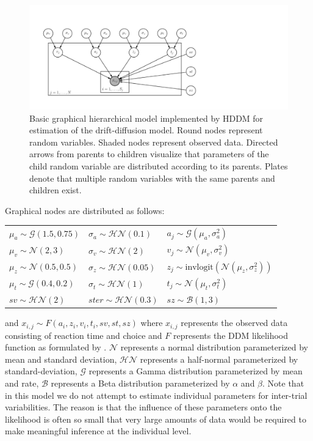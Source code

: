\documentclass[letterpaper,10pt,english]{article}
\begin{document}
\begin{figure}[htbp]
\centering
\capstart

\includegraphics[scale=.7]{graphical_hddm.pdf}
\caption{Basic graphical hierarchical model implemented by HDDM for estimation of the drift-diffusion model. Round nodes represent random variables. Shaded nodes represent observed data. Directed arrows from parents to children visualize that parameters of the child random variable are distributed according to its   parents. Plates denote that multiple random variables with the same   parents and children exist.}\end{figure}

Graphical nodes are distributed as follows:\\
\begin{center}
\begin{tabular}{l|l|l}
$\mu_{a} \sim \mathcal{G}(1.5, 0.75)$ & $\sigma_{a} \sim \mathcal{HN}(0.1)$ & $a_{j} \sim \mathcal{G}(\mu_{a}, \sigma_{a}^2)$ \\
$\mu_{v} \sim \mathcal{N}(2, 3)$ & $\sigma_{v} \sim \mathcal{HN}(2)$ & $v_{j} \sim \mathcal{N}(\mu_{v}, \sigma_{v}^2)$ \\

$\mu_{z} \sim \mathcal{N}(0.5, 0.5)$ & $\sigma_{z} \sim \mathcal{HN}(0.05)$ & $z_{j} \sim \text{invlogit}(\mathcal{N}(\mu_{z}, \sigma_{z}^2))$ \\

$\mu_{t} \sim \mathcal{G}(0.4, 0.2)$ & $\sigma_{t} \sim \mathcal{HN}(1)$ & $t_{j} \sim \mathcal{N}(\mu_{t}, \sigma_{t}^2)$\\

$sv \sim \mathcal{HN}(2)$ & $ster \sim \mathcal{HN}(0.3)$ & $sz \sim \mathcal{B}(1, 3)$
\end{tabular}
\end{center}
and $x_{i, j} \sim F(a_{i}, z_{i}, v_{i}, t_{i}, sv, st, sz)$ where $x_{i, j}$ represents the observed data consisting of
reaction time and choice and $F$ represents the DDM likelihood
function as formulated by \citep{NavarroFuss09}. $\mathcal{N}$
represents a normal distribution parameterized by mean and standard
deviation, $\mathcal{HN}$ represents a half-normal parameterized by
standard-deviation, $\mathcal{G}$ represents a Gamma
distribution parameterized by mean and rate, $\mathcal{B}$
represents a Beta distribution parameterized by $\alpha$ and
$\beta$. Note that in this model we do not attempt to estimate
individual parameters for inter-trial variabilities. The reason is
that the influence of these parameters onto the likelihood is often so
small that very large amounts of data would be required to make
meaningful inference at the individual level.
\end{document}
